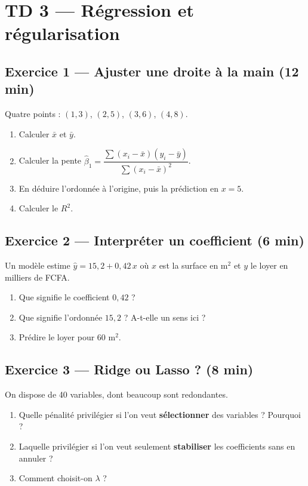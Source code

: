 \section*{TD 3 --- Régression et régularisation}

\subsection*{Exercice 1 --- Ajuster une droite à la main \hfill \normalfont\footnotesize (12 min)}
Quatre points : $(1,3)$, $(2,5)$, $(3,6)$, $(4,8)$.
\begin{enumerate}
  \item Calculer $\bar x$ et $\bar y$.
  \item Calculer la pente $\hat\beta_1=\dfrac{\sum (x_i-\bar x)(y_i-\bar y)}{\sum (x_i-\bar x)^2}$.
  \item En déduire l'ordonnée à l'origine, puis la prédiction en $x=5$.
  \item Calculer le $R^2$.
\end{enumerate}

\subsection*{Exercice 2 --- Interpréter un coefficient \hfill \normalfont\footnotesize (6 min)}
Un modèle estime $\hat y = 15{,}2 + 0{,}42\,x$ où $x$ est la surface en m$^2$
et $y$ le loyer en milliers de FCFA.
\begin{enumerate}
  \item Que signifie le coefficient $0{,}42$ ?
  \item Que signifie l'ordonnée $15{,}2$ ? A-t-elle un sens ici ?
  \item Prédire le loyer pour 60 m$^2$.
\end{enumerate}

\subsection*{Exercice 3 --- Ridge ou Lasso ? \hfill \normalfont\footnotesize (8 min)}
On dispose de 40 variables, dont beaucoup sont redondantes.
\begin{enumerate}
  \item Quelle pénalité privilégier si l'on veut \textbf{sélectionner} des
        variables ? Pourquoi ?
  \item Laquelle privilégier si l'on veut seulement \textbf{stabiliser} les
        coefficients sans en annuler ?
  \item Comment choisit-on $\lambda$ ?
\end{enumerate}

